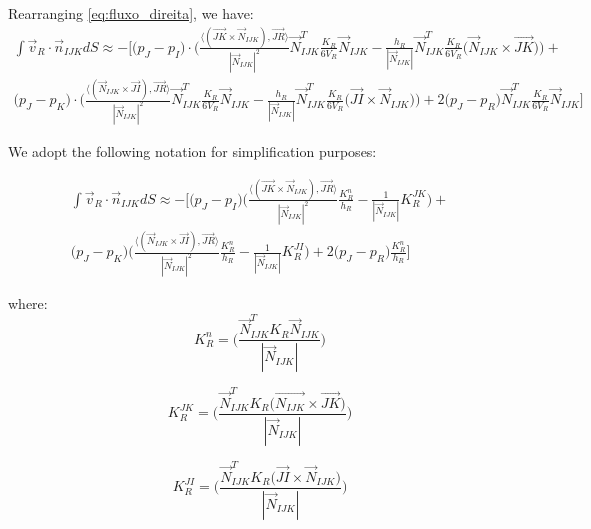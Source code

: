 \documentclass{article}
\begin{document}
Rearranging \ref{eq:fluxo_direita}, we have:
\begin{equation} \label{eq:fluxo_direita_tensor}
\begin{split}
\int{\vec{v}_{R} \cdot \vec{n}_{IJK}dS} 
 \approx -\Bigg[ \big( p_{J} - p_{I}\big) \cdot \Bigg(\frac{\langle(\vec{JK} \times \vec{N}_{IJK}), \vec{JR}\rangle}{|\vec{N}_{IJK}|^2}\vec{N}_{IJK} ^T \frac{K_{R}}{6V_{R}} \vec{N}_{IJK} - \frac{h_{R}}{|\vec{N}_{IJK}|}\vec{N}_{IJK} ^T\frac{K_{R}}{6V_{R}} \Big( \vec{N}_{IJK}\times \vec{JK} \Big) \Bigg) + \\
\big( p_{J} - p_{K} \big) \cdot  \Bigg(\frac{\langle(\vec{N}_{IJK} \times \vec{JI}), \vec{JR}\rangle}{|\vec{N}_{IJK}| ^ 2} \vec{N}_{IJK} ^T \frac{K_{R}}{6V_{R}}\vec{N}_{IJK} - \frac{h_{R}}{|\vec{N}_{IJK}|}\vec{N}_{IJK} ^T\frac{K_{R}}{6V_{R}} \Big( \vec{JI} \times \vec{N}_{IJK} \Big) \Bigg)  + 2 \big(p_{J} - p_{R}\big) \vec{N}_{IJK} ^T\frac{K_{R}}{6V_{R}}\vec{N}_{IJK} \Bigg]
\end{split}
\end{equation}

We adopt the following notation for simplification purposes:

\begin{equation} \label{eq:fluxo_direita_tensor_simplificado}
\begin{split}
\int{\vec{v}_{R} \cdot \vec{n}_{IJK}dS} 
 \approx -\Bigg[ \big( p_{J} - p_{I}\big) \Bigg( \frac{\langle(\vec{JK} \times \vec{N}_{IJK}), \vec{JR}\rangle}{|\vec{N}_{IJK}| ^2} \frac{K^n_{R}}{h_{R}} - \frac{1}{|\vec{N}_{IJK}|}K^{JK}_{R}\Bigg) + \\
\big( p_{J} - p_{K} \big) \Bigg(\frac{\langle(\vec{N}_{IJK} \times \vec{JI}), \vec{JR}\rangle}{|\vec{N}_{IJK}| ^ 2}\frac{K^n_{R}}{h_{R}} - \frac{1}{|\vec{N}_{IJK}|}K^{JI}_{R}\Bigg)  + 
2 \big(p_{J} - p_{R}\big) \frac{K^n_{R}}{h_{R}} \Bigg]
\end{split}
\end{equation}

where:
\begin{displaymath}
	K^{n}_{R} = \Bigg( \frac{\vec{N}_{IJK}^{T} K_{R} \vec{N}_{IJK}}{|\vec{N}_{IJK}|} \Bigg)
	\end{displaymath}
	
\begin{displaymath}
		K^{{JK}}_{R} = \Bigg( \frac{\vec{N}_{IJK}^{T}K_{R} \Big( \vec{N_{IJK}} \times \vec{JK}\Big) }{|\vec{N}_{IJK}|} \Bigg)
\end{displaymath}

\begin{displaymath}
		K^{{JI}}_{R} = \Bigg( \frac{\vec{N}_{IJK}^{T}K_{R} \Big( \vec{JI} \times \vec{N}_{IJK} \Big) }{|\vec{N}_{IJK}|} \Bigg)
\end{displaymath}
	
\end{document}
